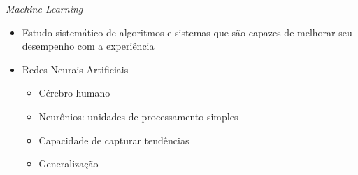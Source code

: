 %

\begin{frame}{\emph{Machine Learning}}
   \ \  \\[0.1cm]
  \begin{itemize}
  \item Estudo sistemático de algoritmos e sistemas que são capazes de melhorar seu desempenho com a experiência
  \ \ \newline
  \item \alert{Redes Neurais Artificiais}
  \begin{itemize}
  \item Cérebro humano
  \ \ \newline
  \item Neurônios: unidades de processamento simples
   \ \ \newline
  \item Capacidade de capturar tendências
   \ \ \newline
  \item Generalização
\end{itemize}
\end{itemize}
\end{frame}

